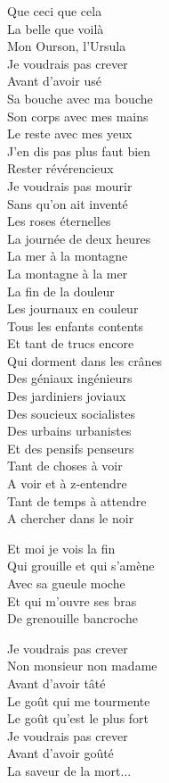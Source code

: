 Que ceci que cela\\
La belle que voilà\\
Mon Ourson, l'Ursula\\
Je voudrais pas crever\\
Avant d'avoir usé\\
Sa bouche avec ma bouche\\
Son corps avec mes mains\\
Le reste avec mes yeux\\
J'en dis pas plus faut bien\\
Rester révérencieux\\
Je voudrais pas mourir\\
Sans qu'on ait inventé\\
Les roses éternelles\\
La journée de deux heures\\
La mer à la montagne\\
La montagne à la mer\\
La fin de la douleur\\
Les journaux en couleur\\
Tous les enfants contents\\
Et tant de trucs encore\\
Qui dorment dans les crânes\\
Des géniaux ingénieurs\\
Des jardiniers joviaux\\
Des soucieux socialistes\\
Des urbains urbanistes\\
Et des pensifs penseurs\\
Tant de choses à voir\\
A voir et à z-entendre\\
Tant de temps à attendre\\
A chercher dans le noir

Et moi je vois la fin\\
Qui grouille et qui s'amène\\
Avec sa gueule moche\\
Et qui m'ouvre ses bras\\
De grenouille bancroche

Je voudrais pas crever\\
Non monsieur non madame\\
Avant d'avoir tâté\\
Le goût qui me tourmente\\
Le goût qu'est le plus fort\\
Je voudrais pas crever\\
Avant d'avoir goûté\\
La saveur de la mort...

